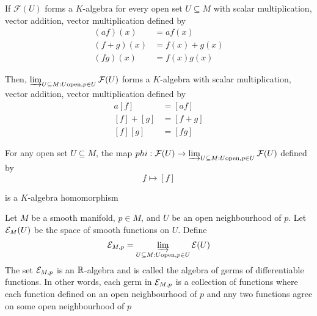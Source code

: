 \begin{proposition}
	If $\mathcal{F}(U)$ forms a $K$-algebra for every open set $U \subseteq M$ with scalar multiplication, vector addition, vector multiplication defined by 
	\begin{align*}
		(a f)(x) &= a f(x) \\
		(f + g)(x) &= f(x) + g(x) \\
		(f g)(x) &= f(x) g(x)
	\end{align*}
	
	Then, $\varinjlim_{U \subseteq M: U \text{open}, p \in U} \mathcal{F}(U)$ forms a $K$-algebra with scalar multiplication, vector addition, vector multiplication defined by
	\begin{align*}
		a [f] &= [a f] \\
		[f] + [g] &= [f + g] \\
		[f] [g] &= [fg]
	\end{align*}
	
	For any open set $U \subseteq M$, the map $phi: \mathcal{F}(U) \to \varinjlim_{U \subseteq M: U \text{open}, p \in U} \mathcal{F}(U)$ defined by
	$$
	f \mapsto [f]
	$$
	
	is a $K$-algebra homomorphism
\end{proposition}

\begin{definition}
	Let $M$ be a smooth manifold, $p \in M$, and $U$ be an open neighbourhood of $p$. Let $\mathcal{E}_M(U)$ be the space of smooth functions on $U$. Define
	$$
	\mathcal{E}_{M, p} = \varinjlim_{U \subseteq M: U \text{open}, p \in U} \mathcal{E}(U)
	$$
	The set $\mathcal{E}_{M, p}$ is an $\mathbb{R}$-algebra and is called the algebra of germs of differentiable functions. In other words, each germ in $\mathcal{E}_{M, p}$ is a collection of functions where each function defined on an open neighbourhood of $p$ and any two functions agree on some open neighbourhood of $p$
\end{definition}


